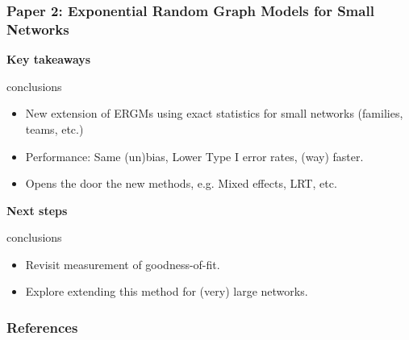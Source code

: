 \documentclass[aspectratio=169, 9pt]{beamer}\usepackage[]{graphicx}\usepackage[]{color}
\begin{document}
\begin{frame}
\frametitle{Paper 2: Exponential Random Graph Models for Small Networks}

{\bf \large Key takeaways}
\begin{beamercolorbox}[dp=1ex]{conclusions}
\begin{itemize}
\item New extension of ERGMs using exact statistics for small networks
(families, teams, etc.)
\item Performance: Same (un)bias, Lower Type I error rates, (way) faster.
\item Opens the door the new methods, e.g. Mixed effects, LRT, etc.
\end{itemize}
\end{beamercolorbox}

\vfill\pause

{\bf \large Next steps}
\begin{beamercolorbox}[dp=1ex]{conclusions}
\begin{itemize}
\item Revisit measurement of goodness-of-fit.
\item Explore extending this method for (very) large networks.
\end{itemize}
\end{beamercolorbox}




\end{frame}


% 

\begin{frame}
\maketitle
\begin{center}
\scalebox{2}{\textcolor{uscgold}{Thanks!}}
\end{center}
\end{frame}

\renewcommand{\section}[2]{}%
\appendix
\begin{frame}[allowframebreaks]
\frametitle{References}
% 
% 
\printbibliography
\end{frame}
\end{document}
